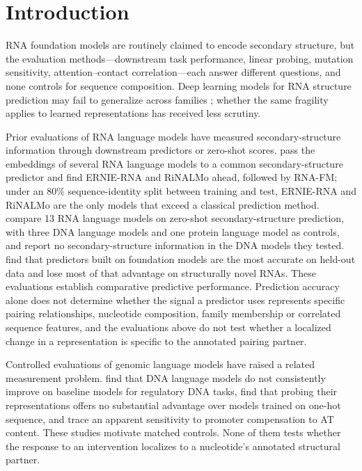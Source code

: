 \documentclass[11pt]{article}
\begin{document}
\section{Introduction}
\label{sec:intro}

RNA foundation models are routinely claimed to encode secondary structure,
but the evaluation methods---downstream task performance, linear probing,
mutation sensitivity, attention--contact correlation---each answer different
questions, and none controls for sequence composition. Deep learning models
for RNA structure prediction may fail to generalize across families
\citep{szikszai2022generalization}; whether the same fragility applies to
learned representations has received less scrutiny.

Prior evaluations of RNA language models have measured secondary-structure
information through downstream predictors or zero-shot scores.
\citet{zablocki2025benchmarking} pass the embeddings of several RNA language
models to a common secondary-structure predictor and find ERNIE-RNA and RiNALMo
ahead, followed by RNA-FM; under an 80\% sequence-identity split between
training and test, ERNIE-RNA and RiNALMo are the only models that exceed a
classical prediction method. \citet{wang2025comparative} compare 13 RNA
language models on zero-shot secondary-structure prediction, with three DNA
language models and one protein language model as controls, and report no
secondary-structure information in the DNA models they tested.
\citet{chen2026fair} find that predictors built on foundation models are the
most accurate on held-out data and lose most of that advantage on structurally
novel RNAs. These evaluations establish comparative predictive performance.
Prediction accuracy alone does not determine whether the signal a predictor
uses represents specific pairing relationships, nucleotide composition, family
membership or correlated sequence features, and the evaluations above do not
test whether a localized change in a representation is specific to the
annotated pairing partner.

Controlled evaluations of genomic language models have raised a related
measurement problem. \citet{patel2024dart} find that DNA language models do not
consistently improve on baseline models for regulatory DNA tasks,
\citet{tang2025evaluating} find that probing their representations offers no
substantial advantage over models trained on one-hot sequence, and
\citet{cheng2026mechanistic} trace an apparent sensitivity to promoter
compensation to AT content. These studies motivate matched controls. None of
them tests whether the response to an intervention localizes to a nucleotide's
annotated structural partner.
\end{document}
